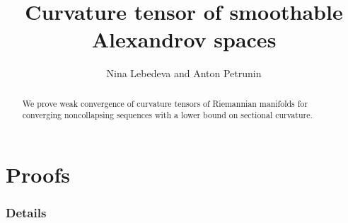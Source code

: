\documentclass[a4paper]{article}
\begin{document}

\title{Curvature tensor of smoothable Alexandrov spaces}
\date{}
\author{Nina Lebedeva and Anton Petrunin} 
\maketitle

\begin{abstract}
We prove weak convergence of curvature tensors of Riemannian manifolds 
for converging noncollapsing sequences with a lower bound on sectional curvature.
\end{abstract}




\tableofcontents




\part*{Proofs}











%

%
%
%

\section*{Details}






{\sloppy

\def\emph{\textit}
\printbibliography[heading=bibintoc]
\fussy
}
\end{document}
